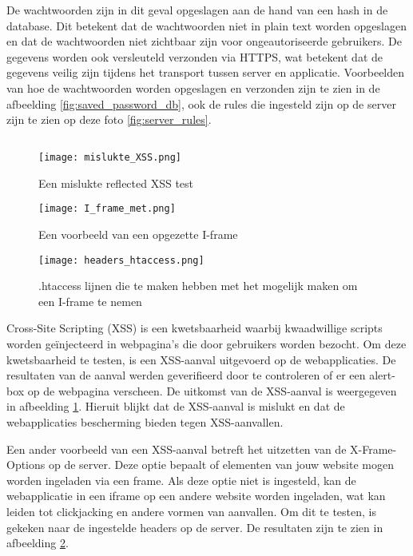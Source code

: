 De wachtwoorden zijn in dit geval opgeslagen aan de hand van een hash in de database. Dit betekent dat de 
wachtwoorden niet in plain text worden opgeslagen en dat de wachtwoorden niet zichtbaar zijn voor ongeautoriseerde gebruikers. 
De gegevens worden ook versleuteld verzonden via HTTPS, wat betekent dat de gegevens veilig zijn tijdens het transport tussen 
server en applicatie. Voorbeelden van hoe de wachtwoorden worden opgeslagen en verzonden zijn te zien in de afbeelding 
\ref{fig:saved_password_db}, ook de rules die ingesteld zijn op de server zijn te zien op deze foto \ref{fig:server_rules}.


\subsection{}
\begin{figure}
    \centering
    \texttt{[image: mislukte\_XSS.png]}
    \caption[Een mislukte reflected XSS test]{Een mislukte reflected XSS test}
    \label{fig:mislukte_XSS}
\end{figure}
\begin{figure}
    \centering
    \texttt{[image: I\_frame\_met.png]}
    \caption[Een voorbeeld van een opgezette I-frame]{Een voorbeeld van een opgezette I-frame}
    \label{fig:i_frame_met}
\end{figure}
\begin{figure}
    \centering
    \texttt{[image: headers\_htaccess.png]}
    \caption[.htaccess lijnen die te maken hebben met het mogelijk maken om een I-frame te nemen]{.htaccess lijnen die te maken hebben met het mogelijk maken om een I-frame te nemen}
    \label{fig:headers_htaccess}
\end{figure}

Cross-Site Scripting (XSS) is een kwetsbaarheid waarbij kwaadwillige scripts worden geïnjecteerd in webpagina's die door 
gebruikers worden bezocht. Om deze kwetsbaarheid te testen, is een XSS-aanval uitgevoerd op de webapplicaties. De resultaten 
van de aanval werden geverifieerd door te controleren of er een alert-box op de webpagina verscheen. De uitkomst van de 
XSS-aanval is weergegeven in afbeelding \ref{fig:mislukte_XSS}. Hieruit blijkt dat de XSS-aanval is mislukt en dat de webapplicaties
bescherming bieden tegen XSS-aanvallen.

Een ander voorbeeld van een XSS-aanval betreft het uitzetten van de X-Frame-Options op de server. Deze optie bepaalt of 
elementen van jouw website mogen worden ingeladen via een frame. Als deze optie niet is ingesteld, kan de webapplicatie in 
een iframe op een andere website worden ingeladen, wat kan leiden tot clickjacking en andere vormen van aanvallen. Om dit te 
testen, is gekeken naar de ingestelde headers op de server. De resultaten zijn te zien in afbeelding \ref{fig:i_frame_met}.

